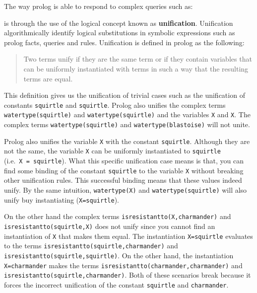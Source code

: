 The way prolog is able to respond to complex queries such as:

\begin{Shaded}
\begin{Highlighting}[]
\NormalTok{)}
 \KeywordTok{=}
 \KeywordTok{=}
\end{Highlighting}
\end{Shaded}

is through the use of the logical concept known as \textbf{unification}.
Unification algorithmically identify logical substitutions in symbolic
expressions such as prolog facts, queries and rules. Unification is
defined in prolog as the following:

\begin{quote}
Two terms unify if they are the same term or if they contain variables
that can be uniformly instantiated with terms in such a way that the
resulting terms are equal.
\end{quote}

This definition gives us the unification of trivial cases such as the
unification of constants \texttt{squirtle} and \texttt{squirtle}. Prolog
also unifies the complex terms \texttt{watertype(squirtle)} and
\texttt{watertype(squirtle)} and the variables \texttt{X} and
\texttt{X}. The complex terms \texttt{watertype(squirtle)} and
\texttt{watertype(blastoise)} will not unite.

Prolog also unifies the variable \texttt{X} with the constant
\texttt{squirtle}. Although they are not the same, the variable
\texttt{X} can be uniformly instantiated to \texttt{squirtle}
(i.e.~\texttt{X\ =\ squirtle}). What this specific unification case
means is that, you can find some binding of the constant
\texttt{squirtle} to the variable \texttt{X} without breaking other
unification rules. This successful binding means that these values
indeed unify. By the same intuition, \texttt{watertype(X)} and
\texttt{watertype(squirtle)} will also unify buy instantiating
(\texttt{X=squirtle}).

On the other hand the complex terms \texttt{isresistantto(X,charmander)}
and \texttt{isresistantto(squirtle,X)} does not unify since you cannot
find an instantiation of \texttt{X} that makes them equal. The
instantiation \texttt{X=squirtle} evaluates to the terms
\texttt{isresistantto(squirtle,charmander)} and
\texttt{isresistantto(squirtle,squirtle)}. On the other hand, the
instantiation \texttt{X=charmander} makes the terms
\texttt{isresistantto(charmander,charmander)} and
\texttt{isresistantto(squirtle,charmander)}. Both of these scenarios
break because it forces the incorrect unification of the constant
\texttt{squirtle} and \texttt{charmander}.

